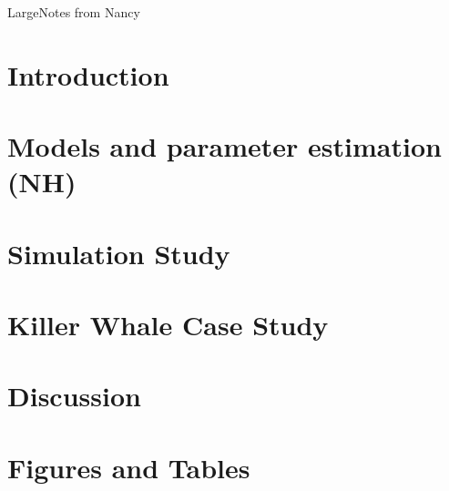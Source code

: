 \documentclass[12pt]{TD-CJS}
\begin{document}

\vfill\eject
{\centerline{Large{Notes from Nancy}}}

\vfill\eject

%
\section{Introduction}

%
\section{Models and parameter estimation (NH)}

%
\section{Simulation Study}

%
\section{Killer Whale Case Study}
\label{sec:case_study}

%
\section{Discussion}

%

\clearpage

\newcommand{\newblock}{}



\clearpage

\begin{appendix}



\end{appendix}

\section{Figures and Tables}


\CJShistory
\end{document}
